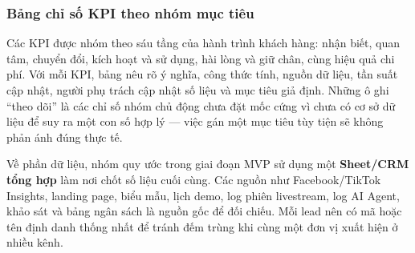 \subsubsection{Bảng chỉ số KPI theo nhóm mục tiêu}

Các KPI được nhóm theo sáu tầng của hành trình khách hàng: nhận biết, quan tâm, chuyển đổi, kích hoạt và sử dụng, hài lòng và giữ chân, cùng hiệu quả chi phí. Với mỗi KPI, bảng nêu rõ ý nghĩa, công thức tính, nguồn dữ liệu, tần suất cập nhật, người phụ trách cập nhật số liệu và mục tiêu giả định. Những ô ghi ``theo dõi'' là các chỉ số nhóm chủ động chưa đặt mốc cứng vì chưa có cơ sở dữ liệu để suy ra một con số hợp lý --- việc gán một mục tiêu tùy tiện sẽ không phản ánh đúng thực tế.

Về phần dữ liệu, nhóm quy ước trong giai đoạn MVP sử dụng một \textbf{Sheet/CRM tổng hợp} làm nơi chốt số liệu cuối cùng. Các nguồn như Facebook/TikTok Insights, landing page, biểu mẫu, lịch demo, log phiên livestream, log AI Agent, khảo sát và bảng ngân sách là nguồn gốc để đối chiếu. Mỗi lead nên có mã hoặc tên định danh thống nhất để tránh đếm trùng khi cùng một đơn vị xuất hiện ở nhiều kênh.

